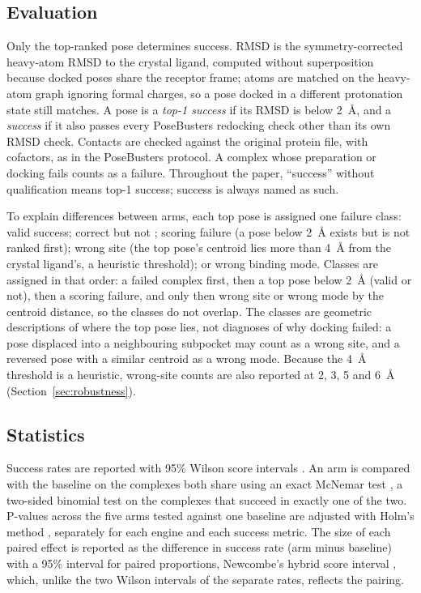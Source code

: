 \subsection{Evaluation}

Only the top-ranked pose determines success. RMSD is the symmetry-corrected heavy-atom
RMSD to the crystal ligand, computed without superposition because docked poses share the
receptor frame; atoms are matched on the heavy-atom graph ignoring formal charges, so a pose
docked in a different protonation state still matches. A pose is a \emph{top-1 success} if
its RMSD is below \SI{2}{\angstrom}, and a \emph{\pbvalid{} success} if it also passes every
PoseBusters \citep{buttenschoen2024posebusters} redocking check other than its own RMSD
check. Contacts are checked against the original protein file, with cofactors, as in the
PoseBusters protocol. A complex whose preparation or docking fails counts as a failure.
Throughout the paper, ``success'' without qualification means top-1 success; \pbvalid{}
success is always named as such.

To explain differences between arms, each top pose is assigned one failure class: valid
success; correct but not \pbvalid{}; scoring failure (a pose below \SI{2}{\angstrom} exists
but is not ranked first); wrong site (the top pose's centroid lies more than
\SI{4}{\angstrom} from the crystal ligand's, a heuristic threshold); or wrong binding mode.
Classes are assigned in that order: a failed complex first, then a top pose below
\SI{2}{\angstrom} (valid or not), then a scoring failure, and only then wrong site or wrong
mode by the centroid distance, so the classes do not overlap. The classes are geometric
descriptions of where the top pose lies, not diagnoses of why docking failed: a pose
displaced into a neighbouring subpocket may count as a wrong site, and a reversed pose
with a similar centroid as a wrong mode. Because the \SI{4}{\angstrom} threshold is a
heuristic, wrong-site counts are also reported at 2, 3, 5 and \SI{6}{\angstrom}
(Section~\ref{sec:robustness}).

\subsection{Statistics}

Success rates are reported with 95\% Wilson score intervals \citep{wilson1927}. An arm is
compared with the baseline on the complexes both share using an exact McNemar test
\citep{mcnemar1947}, a two-sided binomial test on the complexes that succeed in exactly one
of the two. P-values across the five arms tested against one baseline are adjusted with
Holm's method \citep{holm1979}, separately for each engine and each success metric. The
size of each paired effect is reported as the difference in success rate (arm minus
baseline) with a 95\% interval for paired proportions, Newcombe's hybrid score interval
\citep{newcombe1998paired}, which, unlike the two Wilson intervals of the separate rates,
reflects the pairing.

